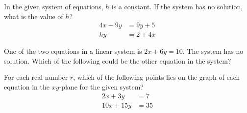 \newpage


\noindent\markforreview

\vspace{1em}

In the given system of equations, \( h \) is a constant. If the system has no solution, what is the value of \( h \)?
\[
\begin{aligned}
4x - 9y &= 9y + 5 \\
hy &= 2 + 4x
\end{aligned}
\]

\vspace{0.75em}


\vspace{2em}
\noindent\markforreview

\vspace{1em}

One of the two equations in a linear system is \( 2x + 6y = 10 \). The system has no solution. Which of the following could be the other equation in the system?

\vspace{0.75em}


\newpage
\noindent\markforreview

\vspace{1em}

For each real number \( r \), which of the following points lies on the graph of each equation in the \( xy \)-plane for the given system?
\[
\begin{aligned}
2x + 3y &= 7 \\
10x + 15y &= 35
\end{aligned}
\]

\vspace{0.75em}



\vspace{2em}

\noindent\markforreview

\vspace{1em}

